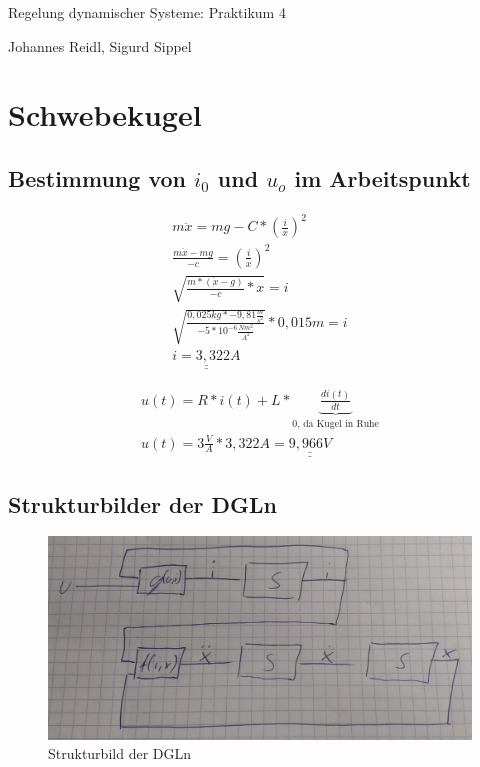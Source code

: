 \documentclass[10pt,a4paper]{article}
\begin{document}
\begin{center}
Regelung dynamischer Systeme: Praktikum 4

Johannes Reidl, Sigurd Sippel
\end{center}

\section{Schwebekugel}
\subsection{Bestimmung von $i_0$ und  $u_o$ im Arbeitspunkt}
\begin{figure}[H]
  \begin{align}
	  m\ddot{x} = mg - C * (\frac{i}{x})^2 \nonumber \\
	  \frac{m\ddot{x} - mg}{-c} = (\frac{i}{x})^2 \nonumber \\
	  \sqrt{\frac{m* (\ddot{x} - g)}{-c} * x} = i \nonumber \\
	  \sqrt{\frac{0,025kg * -9,81\frac{m}{s^2}}{-5 * 10^{-6}\frac{Nm^2}{A^2}}} * 0,015m = i \nonumber \\
	  \underline{\underline{i = 3,322A}} \nonumber
  \end{align}
\end{figure}

\begin{figure}[H]
  \begin{align}
	  u(t) = R * i(t) + L * \underbrace{\frac{di(t)}{dt}}_\text{0, da Kugel in Ruhe} \nonumber \\
	  u(t) = 3\frac{V}{A} * 3,322A = \underline{\underline{9,966V}} \nonumber
  \end{align}
\end{figure}


\subsection{Strukturbilder der DGLn}
\begin{figure}[H]
	\centering
	\includegraphics[width=1\textwidth]{screens/schaltbild.jpg}
	\caption{Strukturbild der DGLn}
\end{figure}
\end{document}

